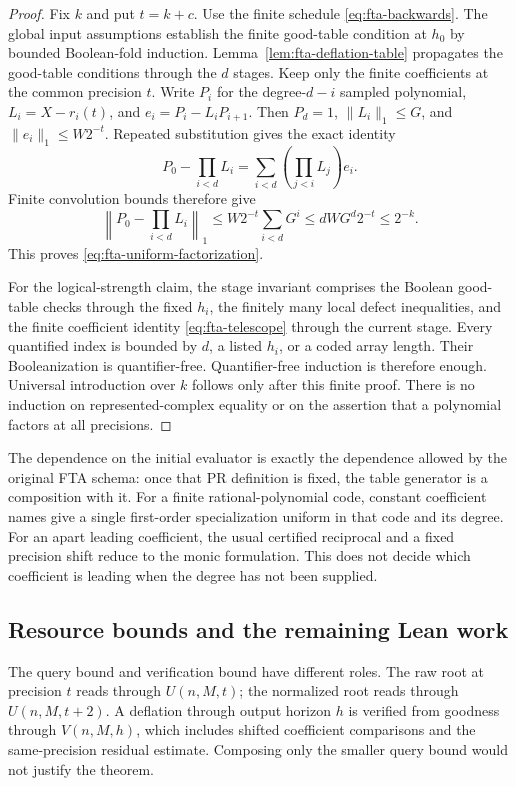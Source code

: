 \begin{proof}
Fix $k$ and put $t=k+c$.  Use the finite schedule
\eqref{eq:fta-backwards}.  The global input assumptions establish the
finite good-table condition at $h_0$ by bounded Boolean-fold induction.
Lemma~\ref{lem:fta-deflation-table} propagates the good-table conditions
through the $d$ stages.  Keep only the finite coefficients at the common
precision $t$.  Write $P_i$ for the degree-$d-i$ sampled polynomial,
$L_i=X-r_i(t)$, and $e_i=P_i-L_iP_{i+1}$.
Then $P_d=1$, $\|L_i\|_1\le G$, and
$\|e_i\|_1\le W2^{-t}$.  Repeated substitution gives the exact identity
\[
 P_0-\prod_{i<d}L_i
   =\sum_{i<d}\left(\prod_{j<i}L_j\right)e_i.
 \tag{F17}\label{eq:fta-telescope}
\]
Finite convolution bounds therefore give
\[
 \left\|P_0-\prod_{i<d}L_i\right\|_1
 \le W2^{-t}\sum_{i<d}G^i
 \le dWG^d2^{-t}\le2^{-k}.
\]
This proves \eqref{eq:fta-uniform-factorization}.

For the logical-strength claim, the stage invariant comprises the Boolean
good-table checks through the fixed $h_i$, the finitely many local
defect inequalities, and the finite coefficient identity
\eqref{eq:fta-telescope} through the current stage.  Every quantified
index is bounded by $d$, a listed $h_i$, or a coded array length.
Their Booleanization is quantifier-free.  Quantifier-free induction is
therefore enough.  Universal introduction over $k$ follows only after
this finite proof.  There is no induction on represented-complex equality
or on the assertion that a polynomial factors at all precisions.
\end{proof}

The dependence on the initial evaluator is exactly the dependence allowed
by the original FTA schema: once that PR definition is fixed, the table
generator is a composition with it.  For a finite rational-polynomial
code, constant coefficient names give a single first-order specialization
uniform in that code and its degree.  For an apart leading coefficient,
the usual certified reciprocal and a fixed precision shift reduce to the
monic formulation.  This does not decide which coefficient is leading
when the degree has not been supplied.

\subsection{Resource bounds and the remaining Lean work}

The query bound and verification bound have different roles.
The raw root at precision $t$ reads through $U(n,M,t)$; the normalized
root reads through $U(n,M,t+2)$.  A deflation through output horizon $h$
is verified from goodness through $V(n,M,h)$, which includes shifted
coefficient comparisons and the same-precision residual estimate.
Composing only the smaller query bound would not justify the theorem.

